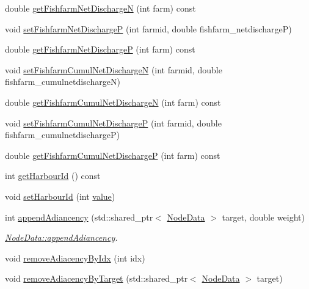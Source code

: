 \begin{DoxyCompactItemize}
double \mbox{\hyperlink{class_node_data_af488cc8bc5898aba67e3151de55b96f8}{get\+Fishfarm\+Net\+DischargeN}} (int farm) const
\item 
void \mbox{\hyperlink{class_node_data_ac37c193019be503886c443c359f65972}{set\+Fishfarm\+Net\+DischargeP}} (int farmid, double fishfarm\+\_\+netdischargeP)
\item 
double \mbox{\hyperlink{class_node_data_a8279b49def32d5fb15cd2c641367232a}{get\+Fishfarm\+Net\+DischargeP}} (int farm) const
\item 
void \mbox{\hyperlink{class_node_data_a28faba9ef597ec271a5bf8393f750126}{set\+Fishfarm\+Cumul\+Net\+DischargeN}} (int farmid, double fishfarm\+\_\+cumulnetdischargeN)
\item 
double \mbox{\hyperlink{class_node_data_ae80bdd94bcbda4d5a887a8d923eefe06}{get\+Fishfarm\+Cumul\+Net\+DischargeN}} (int farm) const
\item 
void \mbox{\hyperlink{class_node_data_a0c4ab1157b518fc6f688deb3defbb4a3}{set\+Fishfarm\+Cumul\+Net\+DischargeP}} (int farmid, double fishfarm\+\_\+cumulnetdischargeP)
\item 
double \mbox{\hyperlink{class_node_data_af12fbce8ac960cdc648eade107699a82}{get\+Fishfarm\+Cumul\+Net\+DischargeP}} (int farm) const
\item 
int \mbox{\hyperlink{class_node_data_ae061a5d82a3dca53bf57702fa0c35d02}{get\+Harbour\+Id}} () const
\item 
void \mbox{\hyperlink{class_node_data_a4e6336f20ffda13091cd79becaca6e30}{set\+Harbour\+Id}} (int \mbox{\hyperlink{diffusion_8cpp_a4b41795815d9f3d03abfc739e666d5da}{value}})
\item 
int \mbox{\hyperlink{class_node_data_aa74aee107185352987907fc2e9f06e4a}{append\+Adiancency}} (std\+::shared\+\_\+ptr$<$ \mbox{\hyperlink{class_node_data}{Node\+Data}} $>$ target, double weight)
\begin{DoxyCompactList}\small\item\em \mbox{\hyperlink{class_node_data_aa74aee107185352987907fc2e9f06e4a}{Node\+Data\+::append\+Adiancency}}. \end{DoxyCompactList}\item 
void \mbox{\hyperlink{class_node_data_a75b19599e6278c1f397cd9389499dc02}{remove\+Adiacency\+By\+Idx}} (int idx)
\item 
void \mbox{\hyperlink{class_node_data_a3b3e9de6c5a6787b729991e89b336505}{remove\+Adiacency\+By\+Target}} (std\+::shared\+\_\+ptr$<$ \mbox{\hyperlink{class_node_data}{Node\+Data}} $>$ target)
\item 

\end{DoxyCompactItemize}
